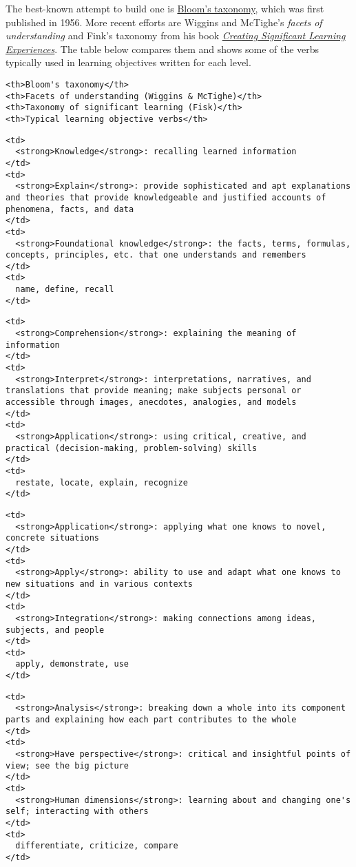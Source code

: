 The best-known attempt to build one is
\href{https://en.wikipedia.org/wiki/Bloom's\_taxonomy}{Bloom's taxonomy},
which was first published in 1956. More recent efforts are Wiggins and
McTighe's \emph{facets of understanding} and Fink's taxonomy from his
book
\emph{\href{http://www.amazon.com/Creating-Significant-Learning-Experiences-Integrated/dp/1118124251/}{Creating
Significant Learning Experiences}}. The table below compares them and
shows some of the verbs typically used in learning objectives written
for each level.

\begin{verbatim}
<th>Bloom's taxonomy</th>
<th>Facets of understanding (Wiggins & McTighe)</th>
<th>Taxonomy of significant learning (Fisk)</th>
<th>Typical learning objective verbs</th>
\end{verbatim}

\begin{verbatim}
<td>
  <strong>Knowledge</strong>: recalling learned information
</td>
<td>
  <strong>Explain</strong>: provide sophisticated and apt explanations and theories that provide knowledgeable and justified accounts of phenomena, facts, and data
</td>
<td>
  <strong>Foundational knowledge</strong>: the facts, terms, formulas, concepts, principles, etc. that one understands and remembers
</td>
<td>
  name, define, recall
</td>
\end{verbatim}

\begin{verbatim}
<td>
  <strong>Comprehension</strong>: explaining the meaning of information
</td>
<td>
  <strong>Interpret</strong>: interpretations, narratives, and translations that provide meaning; make subjects personal or accessible through images, anecdotes, analogies, and models
</td>
<td>
  <strong>Application</strong>: using critical, creative, and practical (decision-making, problem-solving) skills
</td>
<td>
  restate, locate, explain, recognize
</td>
\end{verbatim}

\begin{verbatim}
<td>
  <strong>Application</strong>: applying what one knows to novel, concrete situations
</td>
<td>
  <strong>Apply</strong>: ability to use and adapt what one knows to new situations and in various contexts
</td>
<td>
  <strong>Integration</strong>: making connections among ideas, subjects, and people
</td>
<td>
  apply, demonstrate, use
</td>
\end{verbatim}

\begin{verbatim}
<td>
  <strong>Analysis</strong>: breaking down a whole into its component parts and explaining how each part contributes to the whole
</td>
<td>
  <strong>Have perspective</strong>: critical and insightful points of view; see the big picture
</td>
<td>
  <strong>Human dimensions</strong>: learning about and changing one's self; interacting with others
</td>
<td>
  differentiate, criticize, compare
</td>
\end{verbatim}

